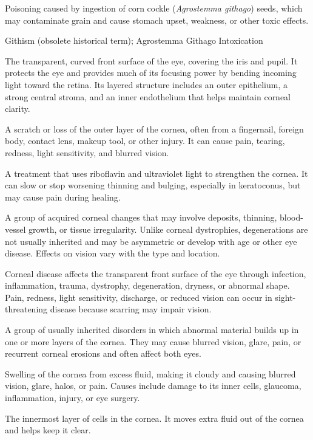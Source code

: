  Poisoning caused by ingestion of corn cockle (\textit{Agrostemma githago}) seeds, which may contaminate grain and cause stomach upset, weakness, or other toxic effects.

\synonyms
Githism (obsolete historical term); Agrostemma Githago Intoxication

 The transparent, curved front surface of the eye, covering the iris and pupil. It protects
the eye and provides much of its focusing power by bending incoming light toward the retina.
Its layered structure includes an outer epithelium, a strong central stroma, and an inner
endothelium that helps maintain corneal clarity.

 A scratch or loss of the outer layer of the cornea, often from a fingernail, foreign body, contact lens, makeup tool, or other injury. It can cause pain, tearing, redness, light sensitivity, and blurred vision.

 A treatment that uses riboflavin and ultraviolet light to strengthen the cornea. It can slow or stop worsening thinning and bulging, especially in keratoconus, but may cause pain during healing.

 A group of acquired corneal changes that may involve deposits, thinning, blood-vessel growth, or tissue irregularity. Unlike corneal dystrophies, degenerations are not usually inherited and may be asymmetric or develop with age or other eye disease. Effects on vision vary with the type and location.

 Corneal disease affects the transparent front surface of the eye through infection, inflammation, trauma, dystrophy, degeneration, dryness, or abnormal shape. Pain, redness, light sensitivity, discharge, or reduced vision can occur in sight-threatening disease because scarring may impair vision.

 A group of usually inherited disorders in which abnormal material builds up in one or more layers of the cornea. They may cause blurred vision, glare, pain, or recurrent corneal erosions and often affect both eyes.

 Swelling of the cornea from excess fluid, making it cloudy and causing blurred vision, glare, halos, or pain. Causes include damage to its inner cells, glaucoma, inflammation, injury, or eye surgery.

 The innermost layer of cells in the cornea. It moves extra fluid out of the cornea and helps keep it clear.

